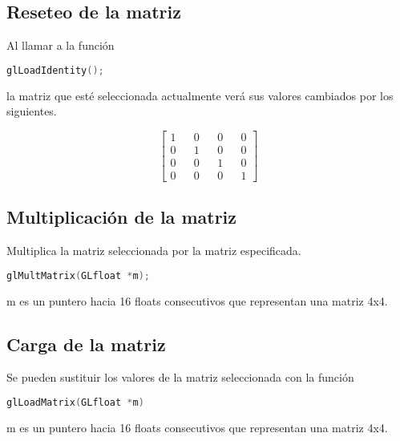 \subsection{Reseteo de la matriz}
Al llamar a la función
\begin{lstlisting}[language=C]
  glLoadIdentity();
\end{lstlisting}
la matriz que esté seleccionada actualmente verá sus valores cambiados por los siguientes.
\begin{figure}[ht]
  \centering
  \[
  \begin{bmatrix}
    1 && 0 && 0 && 0\\
    0 && 1 && 0 && 0\\
    0 && 0 && 1 && 0\\
    0 && 0 && 0 && 1
  \end{bmatrix}
  \]
\end{figure}
\subsection{Multiplicación de la matriz}
Multiplica la matriz seleccionada por la matriz especificada.
\begin{lstlisting}[language=C]
  glMultMatrix(GLfloat *m);
\end{lstlisting}
m es un puntero hacia 16 floats consecutivos que representan una matriz 4x4.
\subsection{Carga de la matriz}
Se pueden sustituir los valores de la matriz seleccionada con la función
\begin{lstlisting}[language=C]
  glLoadMatrix(GLfloat *m)
\end{lstlisting}
m es un puntero hacia 16 floats consecutivos que representan una matriz 4x4.


